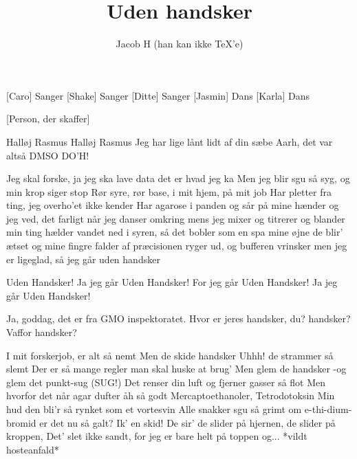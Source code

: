\documentclass[a4paper,11pt]{article}
\title{Uden handsker}
\author{Jacob H (han kan ikke \TeX'e)}
\begin{document}
\maketitle

\begin{roles}
    [Caro] Sanger
    [Shake] Sanger
    [Ditte] Sanger
    [Jasmin] Dans
    [Karla] Dans
\end{roles}

\begin{props}
    [Person, der skaffer]
\end{props}

\begin{song}
   Halløj Rasmus
   Halløj Rasmus
   Jeg har lige lånt lidt af din sæbe
   Aarh, det var altså DMSO
   DO’H!

  Jeg skal forske, ja jeg ska
  lave data det er hvad jeg ka
  Men jeg blir sgu så syg, og min krop siger stop
  Rør syre, rør base, i mit hjem, på mit job
   Har pletter fra ting, jeg overho'et ikke kender
  Har agarose i panden og sår på mine hænder
  og jeg ved, det farligt når jeg danser omkring
  mens jeg mixer og titrerer og blander min ting
   hælder vandet ned i syren, så det bobler som en spa
  mine øjne de blir' ætset og mine fingre falder af
  præcisionen ryger ud, og bufferen vrinsker
  men jeg er ligeglad, så jeg går uden handsker

  Uden Handsker! 
   Ja jeg går
    Uden Handsker!
   For jeg går
   Uden Handsker!
   Ja jeg går
   Uden Handsker!   
  
   Ja, goddag, det er fra GMO inspektoratet. Hvor er jeres handsker, du?
   handsker? Vaffor handsker?

  I mit forskerjob, er alt så nemt
  Men de skide handsker Uhhh! de strammer så slemt
  Der er så mange regler man skal huske at brug'
  Men glem de handsker -og glem det punkt-sug (SUG!)
   Det renser din luft og fjerner gasser så flot
  Men hvorfor det når agar dufter åh så godt
  Mercaptoethanoler, Tetrodotoksin
  Min hud den bli’r så rynket som et vortesvin
   Alle snakker sgu så grimt om e-thi-dium-bromid
  er det nu så galt? Ik' en skid!
  De sir' de slider på hjernen, de slider på kroppen,
  Det’ slet ikke sandt, for jeg er bare helt på toppen og... *vildt hosteanfald*


\end{song}
\end{document}
